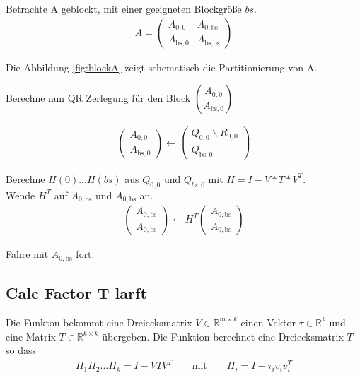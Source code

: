 Betrachte A geblockt, mit einer geeigneten Blockgröße $bs$.
\begin{align}
	A = \left(\begin{array}{l|l}
	A_{0, 0} & A_{0, \text{bs}} \\ \hline
	A_{\text{bs}, 0}   & A_{\text{bs}, \text{bs}} 	
	\end{array} \right) 
\end{align}

Die Abbildung \ref{fig:blockA} zeigt schematisch die Partitionierung von A.

Berechne nun QR Zerlegung für den Block $
\left(\dfrac{A_{0, 0}}{A_{\text{bs}, 0}} \right)$


\begin{align}
	\left(\begin{array}{l} 
	A_{0, 0} \\ \hline
	A_{\text{bs}, 0}
	\end{array}\right)
	\leftarrow
	\left(\begin{array}{l} 
	Q_{0, 0}  \backslash R_{0,0} \\ \hline
	Q_{\text{bs}, 0} 
	\end{array}\right)
\end{align}



Berechne $H(0)$...$H(bs)$ aus $Q_{0, 0}$ und $Q_{bs, 0}$ mit $H = I - V*T*V^T$.\\
Wende $H^T$ auf $A_{0, \text{bs}}$ und $ A_{0,\text{bs}}$ an.
\begin{align}
	\left(\begin{array}{l} 
	A_{0, \text{bs}} \\ \hline
	A_{0, \text{bs}}
	\end{array}\right)
	\leftarrow
	H^T \left(\begin{array}{l} 
	A_{0, \text{bs}} \\ \hline
	A_{0, \text{bs}}
	\end{array}\right)
\end{align}



Fahre mit $A_{0, \text{bs}}$ fort.

\subsection{Calc Factor T larft}

Die Funkton bekommt eine Dreiecksmatrix $V \in \mathbb{R}^{m \times k}$ einen Vektor $\tau \in \mathbb{R}^k$ und eine Matrix $T\in \mathbb{R}^{k\times k}$ übergeben. 
Die Funktion berechnet eine Dreiecksmatrix $T$ so dass
\begin{align*}
	H_1H_2...H_k = I - VTV^T \qquad \text{mit}\qquad H_i = I - \tau_i v_iv_i^T
\end{align*}

